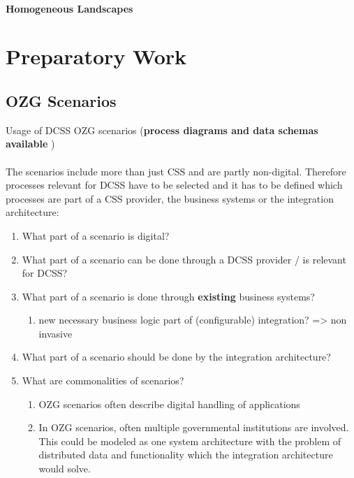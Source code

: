 \documentclass[
     12pt,         %
     a4paper,      %
     BCOR10mm,     %
     DIV14,        %
aragraph skip instad of paragraph indent
     ]{scrreprt}
\begin{document}
\subsubsection{Homogeneous Landscapes}


\chapter{Preparatory Work}

\section{OZG Scenarios}

Usage of DCSS OZG scenarios (\textbf{process diagrams and data schemas available}
\cite{ozgScenarios})
\\\\
The scenarios include more than just CSS and are partly non-digital. Therefore processes relevant for DCSS have to be selected
and it has to be defined which processes are part of a CSS provider, the business systems or the integration architecture:

\begin{enumerate}
     \item What part of a scenario is digital?
     \item What part of a scenario can be done through a DCSS provider / is relevant for DCSS?
     \item What part of a scenario is done through \textbf{existing} business systems?
           \begin{enumerate}
                \item new necessary business logic part of (configurable) integration? => non invasive
           \end{enumerate}
     \item What part of a scenario should be done by the integration architecture?
     \item What are commonalities of scenarios?
           \begin{enumerate}
                \item OZG scenarios often describe digital handling of applications
                \item In OZG scenarios, often multiple governmental institutions are involved. This could be modeled as one system architecture with the problem of distributed
                      data and functionality which the integration architecture would solve.
           \end{enumerate}
\end{enumerate}
\end{document}
